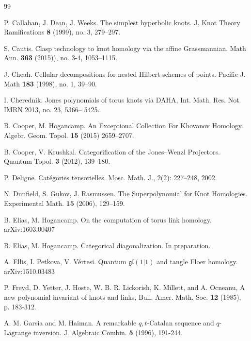 \documentclass[12pt]{amsart}
\numberwithin{equation}{section}
\theoremstyle{definition}
\theoremstyle{remark}
\renewcommand{\1}{\mathbf{1}}
\newcommand{\fgl}{\mathfrak{gl}}
\begin{document}
\begin{thebibliography}{99}

 P. Callahan, J.  Dean, J. Weeks.
The simplest hyperbolic knots. 
J. Knot Theory Ramifications {\bf 8} (1999), no. 3, 279--297.

 S. Cautis. Clasp technology to knot homology via the affine Grassmannian. Math Ann. {\bf 363} (2015)), no. 3-4,
1053--1115.

 J. Cheah. Cellular decompositions for nested Hilbert schemes of points. Pacific J. Math {\bf 183} (1998), no. 1, 39--90.

 I. Cherednik. Jones polynomials of torus knots via DAHA, Int. Math. Res. Not. IMRN 2013, no. 23, 5366--
5425.


 B. Cooper, M. Hogancamp. An Exceptional Collection For Khovanov Homology.
Algebr. Geom. Topol. {\bf 15} (2015) 2659--2707.

 B. Cooper, V. Krushkal. Categorification of the Jones--Wenzl Projectors.
Quantum Topol. {\bf 3} (2012), 139--180.

 P. Deligne. Cat\'egories tensorielles. Mosc. Math. J., 2(2): 227--248, 2002.

 N. Dunfield, S. Gukov, J. Rasmussen. The Superpolynomial for Knot Homologies.
Experimental Math. {\bf 15} (2006), 129--159. 

 B. Elias, M. Hogancamp. On the computation of torus link homology. arXiv:1603.00407

  B. Elias, M. Hogancamp.  Categorical diagonalization. In preparation.

 A. Ellis, I. Petkova, V. V\'ertesi. Quantum $\fgl(1|1)$ and tangle Floer homology. arXiv:1510.03483

P. Freyd, D. Yetter, J. Hoste, W. B. R. Lickorish, K. Millett, and A. Ocneanu, 
 A new polynomial invariant of knots and links, 
Bull. Amer. Math. Soc. {\bf 12} (1985), p. 183-312.

 A. M. Garsia and M. Haiman.  A remarkable {$q,t$}-{C}atalan sequence and {$q$}-{L}agrange inversion. J. Algebraic Combin. {\bf 5} (1996), 191-244. 


\end{thebibliography}
\end{document}
